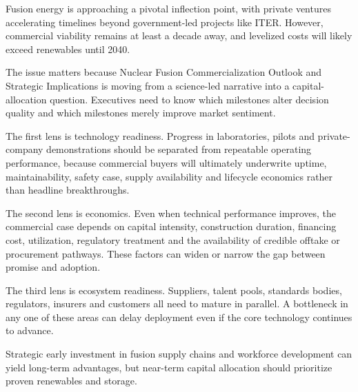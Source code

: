 \documentclass[10pt,a4paper]{article}
\begin{document}
\par\vspace{1pt}
{\small Fusion energy is approaching a pivotal inflection point, with private ventures accelerating timelines beyond government-led projects like ITER. However, commercial viability remains at least a decade away, and levelized costs will likely exceed renewables until 2040.}\par
{\small The issue matters because Nuclear Fusion Commercialization Outlook and Strategic Implications is moving from a science-led narrative into a capital-allocation question. Executives need to know which milestones alter decision quality and which milestones merely improve market sentiment.}\par
{\small The first lens is technology readiness. Progress in laboratories, pilots and private-company demonstrations should be separated from repeatable operating performance, because commercial buyers will ultimately underwrite uptime, maintainability, safety case, supply availability and lifecycle economics rather than headline breakthroughs.}\par
{\small The second lens is economics. Even when technical performance improves, the commercial case depends on capital intensity, construction duration, financing cost, utilization, regulatory treatment and the availability of credible offtake or procurement pathways. These factors can widen or narrow the gap between promise and adoption.}\par
{\small The third lens is ecosystem readiness. Suppliers, talent pools, standards bodies, regulators, insurers and customers all need to mature in parallel. A bottleneck in any one of these areas can delay deployment even if the core technology continues to advance.}\par
{}\par\vspace{1pt}
{\small Strategic early investment in fusion supply chains and workforce development can yield long-term advantages, but near-term capital allocation should prioritize proven renewables and storage.}\par
\label{chap:1:end}
\end{document}
